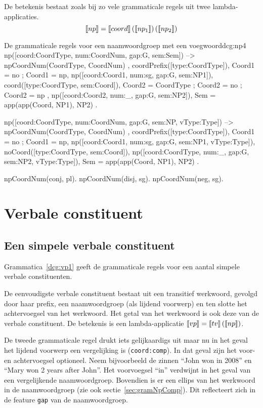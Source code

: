 De betekenis bestaat zoals bij zo vele grammaticale regels uit twee lambda-applicaties. $$\llbracket np\rrbracket = \llbracket coord\rrbracket \left( \llbracket np_1\rrbracket \right) \left( \llbracket np_2\rrbracket \right)$$

\begin{dcg}{De grammaticale regels voor een naamwoordgroep met een voegwoord}{dcg:np4}
np([coord:CoordType, num:CoordNum, gap:G, sem:Sem]) -->
  { npCoordNum(CoordType, CoordNum) },
  coordPrefix([type:CoordType]),
  { Coord1 = no ; Coord1 = np},
  np([coord:Coord1, num:sg, gap:G, sem:NP1]),
  coord([type:CoordType, sem:Coord]),
  { Coord2 = CoordType ; Coord2 = no ; Coord2 = np },
  np([coord:Coord2, num:_, gap:G, sem:NP2]),
  { Sem = app(app(Coord, NP1), NP2) }.

np([coord:CoordType, num:CoordNum, gap:G, sem:NP, vType:Type]) -->
  { npCoordNum(CoordType, CoordNum) },
  coordPrefix([type:CoordType]),
  { Coord1 = no ; Coord1 = np},
  np([coord:Coord1, num:sg, gap:G, sem:NP1, vType:Type]),
  noCoord([type:CoordType, sem:Coord]),
  np([coord:CoordType, num:_, gap:G, sem:NP2, vType:Type]),
  { Sem = app(app(Coord, NP1), NP2) }.

npCoordNum(conj, pl).
npCoordNum(disj, sg).
npCoordNum(neg, sg).
\end{dcg}

\section{Verbale constituent}
\subsection{Een simpele verbale constituent}
Grammatica~\ref{dcg:vp1} geeft de grammaticale regels voor een aantal simpele verbale constituenten.

De eenvoudigste verbale constituent bestaat uit een transitief werkwoord, gevolgd door haar prefix, een naamwoordgroep (als lijdend voorwerp) en ten slotte het achtervoegsel van het werkwoord. Het getal van het werkwoord is ook deze van de verbale constituent. De betekenis is een lambda-applicatie $\llbracket vp\rrbracket = \llbracket tv\rrbracket \left( {\llbracket np\rrbracket} \right)$.

De tweede grammaticale regel drukt iets gelijkaardigs uit maar nu in het geval het lijdend voorwerp een vergelijking is (\texttt{coord:comp}). In dat geval zijn het voor- en achtervoegsel optioneel. Neem bijvoorbeeld de zinnen ``John won in 2008'' en ``Mary won 2 years after John''. Het voorvoegsel ``in'' verdwijnt in het geval van een vergelijkende naamwoordgroep. Bovendien is er een ellips van het werkwoord in de naamwoordgroep (zie ook sectie~\ref{sec:gramNpComp}). Dit reflecteert zich in de feature \texttt{gap} van de naamwoordgroep. 

